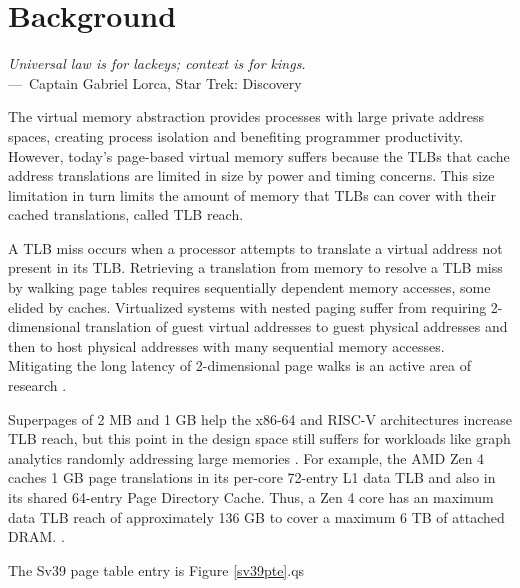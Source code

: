 
\chapter{Background}
\label{ch:Background}

\begin{epigraph}
	\emph{Universal law is for lackeys; context is for kings.}\\
	---~Captain Gabriel Lorca, Star Trek: Discovery
\end{epigraph}

The virtual memory abstraction provides processes with large private address spaces, creating process isolation and benefiting programmer productivity. However, today's page-based virtual memory suffers because the \ac{TLB}s that cache address translations are limited in size by power and timing concerns. This size limitation in turn limits the amount of memory that \ac{TLB}s can cover with their cached translations, called \ac{TLB} reach.

A TLB miss occurs when a processor attempts to translate a virtual address not present in its TLB. Retrieving a translation from memory to resolve a TLB miss by walking page tables requires sequentially dependent memory accesses, some elided by caches. Virtualized systems with nested paging suffer from requiring 2-dimensional translation of guest virtual addresses to guest physical addresses and then to host physical addresses with many sequential memory accesses. Mitigating the long latency of 2-dimensional page walks is an active area of research \cite{gandhi_efficient_2014, teabe_nocompromis_2021, bergman_translation_2023}.

Superpages of 2 MB and 1 GB  help the x86-64 and RISC-V architectures increase TLB reach, but this point in the design space still suffers for workloads like graph analytics randomly addressing large memories \cite{manocha_implications_2022}. For example, the AMD Zen 4 caches 1 GB page translations in its per-core 72-entry L1 data TLB and also in its shared 64-entry Page Directory Cache. Thus, a Zen 4 core has an maximum data TLB reach of approximately 136 GB to cover a maximum 6 TB of attached DRAM. \cite{advanced_micro_devices_software_2023}.


The Sv39 page table entry is Figure \ref{sv39pte}.qs

